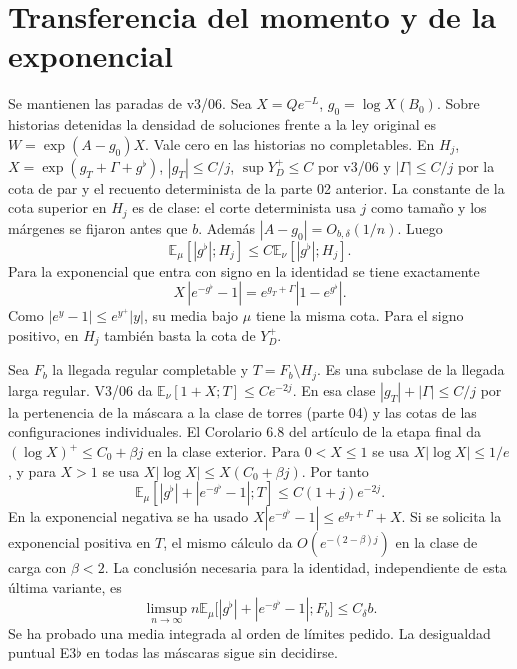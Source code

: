 \section*{Transferencia del momento y de la exponencial}
Se mantienen las paradas de v3/06. Sea \(X=Qe^{-L}\), \(g_0=\log X(B_0)\).
Sobre historias detenidas la densidad de soluciones frente a la ley original
es \(W=\exp(A-g_0)X\). Vale cero en las historias no completables.
En \(H_j\), \(X=\exp(g_T+\Gamma+g^\flat)\), \(|g_T|\le C/j\),
\(\sup Y_D^+\le C\) por v3/06 y \(|\Gamma|\le C/j\) por la cota de par y el
recuento determinista de la parte 02 anterior. La constante de la cota superior
en \(H_j\) es de clase: el corte determinista usa \(j\) como tamaño y los márgenes
se fijaron antes que \(b\). Además \(|A-g_0|=O_{b,\delta}(1/n)\).
Luego
\[
 \mathbb E_\mu[|g^\flat|;H_j]\le C\mathbb E_\nu[|g^\flat|;H_j].
\]
Para la exponencial que entra con signo en la identidad se tiene exactamente
\[
 X\,|e^{-g^\flat}-1|=e^{g_T+\Gamma}|1-e^{g^\flat}|.
\]
Como \(|e^y-1|\le e^{y^+}|y|\), su media bajo \(\mu\) tiene la misma cota.
Para el signo positivo, en \(H_j\) también basta la cota de \(Y_D^+\).

Sea \(F_b\) la llegada regular completable y \(T=F_b\setminus H_j\).
Es una subclase de la llegada larga regular. V3/06 da
\(\mathbb E_\nu[1+X;T]\le C e^{-2j}\).
En esa clase \(|g_T|+|\Gamma|\le C/j\) por la pertenencia de la máscara a la
clase de torres (parte 04) y las cotas de las configuraciones individuales.
El Corolario 6.8 del artículo de la etapa final da
\((\log X)^+\le C_0+\beta j\) en la clase exterior.
Para \(0<X\le1\) se usa \(X|\log X|\le1/e\), y para \(X>1\) se usa
\(X|\log X|\le X(C_0+\beta j)\). Por tanto
\[
 \mathbb E_\mu[|g^\flat|+|e^{-g^\flat}-1|;T]\le C(1+j)e^{-2j}.
\]
En la exponencial negativa se ha usado
\(X|e^{-g^\flat}-1|\le e^{g_T+\Gamma}+X\).
Si se solicita la exponencial positiva en \(T\), el mismo cálculo da
\(O(e^{-(2-\beta)j})\) en la clase de carga con \(\beta<2\).
La conclusión necesaria para la identidad, independiente de esta última variante, es
\[
 \limsup_{n\to\infty}n\mathbb E_\mu
 \bigl[|g^\flat|+|e^{-g^\flat}-1|;F_b\bigr]\le C_\delta b .
\]
Se ha probado una media integrada al orden de límites pedido.
La desigualdad puntual E3\(\flat\) en todas las máscaras sigue sin decidirse.
